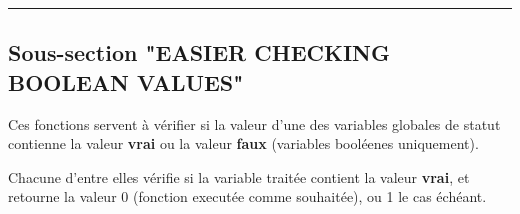 \documentclass[a4paper,10pt]{article}
\begin{document}


\color{green}\par\noindent\rule{\textwidth}{0.4pt}\color{white}

\color{green}
\subsection{Sous-section "EASIER CHECKING BOOLEAN VALUES"}\color{white}

\begin{justify}
    Ces fonctions servent à vérifier si la valeur d'une des variables globales de statut contienne la valeur \textbf{vrai} ou la valeur \textbf{faux} (variables booléenes uniquement).
\end{justify}

\begin{justify}
    Chacune d'entre elles vérifie si la variable traitée contient la valeur \textbf{vrai}, et retourne la valeur 0 (fonction executée comme souhaitée), ou 1 le cas échéant.
\end{justify}
\end{document}
